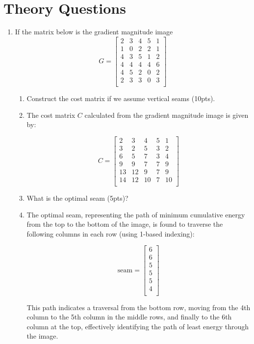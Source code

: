 \documentclass[12pt]{article}
\begin{document}
\section{Theory Questions}
\begin{enumerate}

\item If the matrix below is the gradient magnitude image
$$G =
\begin{bmatrix}
2&	3&	4&	5&	1\\
1&	0&	2&	2&	1\\
4&	3&	5&	1&	2\\
4&	4&	4&	4&	6\\
4&	5&	2&	0&	2\\
2&	3&	3&	0&	3\\
\end{bmatrix}
$$

\begin{enumerate}
\item Construct the cost matrix if we assume vertical seams (10pts).

\item The cost matrix \(C\) calculated from the gradient magnitude image is given by:

\[
C =
\begin{bmatrix}
	2 & 3 & 4 & 5 & 1 \\
	3 & 2 & 5 & 3 & 2 \\
	6 & 5 & 7 & 3 & 4 \\
	9 & 9 & 7 & 7 & 9 \\
	13 & 12 & 9 & 7 & 9 \\
	14 & 12 & 10 & 7 & 10 \\
\end{bmatrix}
\]

\item What is the optimal seam (5pts)?

\item The optimal seam, representing the path of minimum cumulative energy from the top to the bottom of the image, is found to traverse the following columns in each row (using 1-based indexing):

\[
\text{seam} =
\begin{bmatrix}
	6 \\
	6 \\
	5 \\
	5 \\
	5 \\
	4 \\
\end{bmatrix}
\]

This path indicates a traversal from the bottom row, moving from the 4th column to the 5th column in the middle rows, and finally to the 6th column at the top, effectively identifying the path of least energy through the image.



\end{enumerate}

\end{enumerate}
\end{document}
